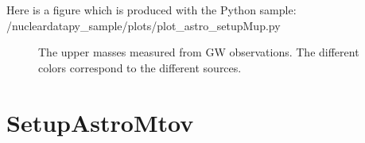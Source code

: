 \documentclass[letterpaper,10pt,english]{sphinxmanual}
\begin{document}
\sphinxAtStartPar
Here is a figure which is produced with the Python sample: /nucleardatapy\_sample/plots/plot\_astro\_setupMup.py

\begin{figure}[htbp]
\centering
\capstart

\noindent{}
\caption{The upper masses measured from GW observations. The different colors correspond to the different sources.}\label{\detokenize{source/api/setup_astro_mup:id1}}\end{figure}

\sphinxstepscope


\section{SetupAstroMtov}
\label{\detokenize{source/api/setup_astro_mtov:setupastromtov}}\label{\detokenize{source/api/setup_astro_mtov::doc}}\label{\detokenize{source/api/setup_astro_mtov:module-nucleardatapy.astro.setup_mtov}}
\end{document}
